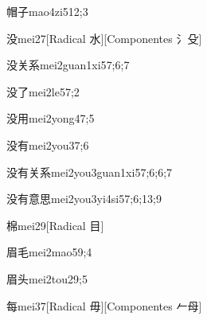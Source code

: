 \begin{verbete}{帽子}{mao4zi5}{12;3}
\end{verbete}

\begin{verbete}{没}{mei2}{7}[Radical 水][Componentes 氵殳]
\end{verbete}

\begin{verbete}{没关系}{mei2guan1xi5}{7;6;7}
\end{verbete}

\begin{verbete}{没了}{mei2le5}{7;2}
\end{verbete}

\begin{verbete}{没用}{mei2yong4}{7;5}
\end{verbete}

\begin{verbete}{没有}{mei2you3}{7;6}
\end{verbete}

\begin{verbete}{没有关系}{mei2you3guan1xi5}{7;6;6;7}
\end{verbete}

\begin{verbete}{没有意思}{mei2you3yi4si5}{7;6;13;9}
\end{verbete}

\begin{verbete}{棉}{mei2}{9}[Radical 目]
\end{verbete}

\begin{verbete}{眉毛}{mei2mao5}{9;4}
\end{verbete}

\begin{verbete}{眉头}{mei2tou2}{9;5}
\end{verbete}

\begin{verbete}{每}{mei3}{7}[Radical 毋][Componentes 𠂉母]
\end{verbete}

